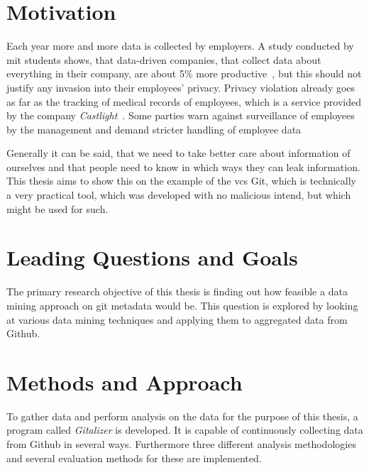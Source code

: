 \section{Motivation}
Each year more and more data is collected by employers.
A study conducted by \ac{mit} students shows, that data-driven companies, that collect data about everything in their company, are about 5\% more productive~\cite{article:management-revolution}, but this should not justify any invasion into their employees' privacy.
Privacy violation already goes as far as the tracking of medical records of employees, which is a service provided by the company \emph{Castlight}~\cite{article:medical-data}.
Some parties warn against surveillance of employees by the management and demand stricter handling of employee data~\cite{article:vermessung-belegschaft}

Generally it can be said, that we need to take better care about information of ourselves and that people need to know in which ways they can leak information.
This thesis aims to show this on the example of the \ac{vcs} Git, which is technically a very practical tool, which was developed with no malicious intend, but which might be used for such.

\section{Leading Questions and Goals}

The primary research objective of this thesis is finding out how feasible a data mining approach on git metadata would be.
This question is explored by looking at various data mining techniques and applying them to aggregated data from Github.

\section{Methods and Approach}

To gather data and perform analysis on the data for the purpose of this thesis, a program called \emph{Gitalizer} is developed.
It is capable of continuously collecting data from Github in several ways.
Furthermore three different analysis methodologies and several evaluation methods for these are implemented.
